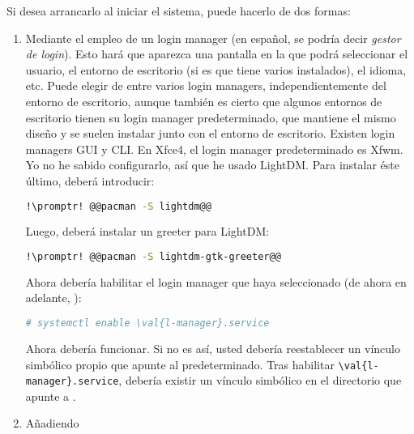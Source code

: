 Si desea arrancarlo al iniciar el sistema, puede hacerlo de dos formas:

\begin{enumerate}

  \item Mediante el empleo de un login manager (en español, se podría decir \emph{gestor de login}). Esto hará
    que aparezca una pantalla en la que podrá seleccionar el usuario, el entorno de escritorio (si es que tiene
    varios instalados), el idioma, etc. Puede elegir de entre varios login managers, independientemente del
    entorno de escritorio, aunque también es cierto que algunos entornos de escritorio tienen su login manager
    predeterminado, que mantiene el mismo diseño y se suelen instalar junto con el entorno de escritorio.
    Existen login managers GUI y CLI. En Xfce4, el login manager predeterminado es Xfwm. Yo no he sabido
    configurarlo, así que he usado LightDM. Para instalar éste último, deberá introducir:

    \begin{lstlisting}[gobble=2,language=bash,style=bashinteract,escapechar=!]
      !\promptr! @@pacman -S lightdm@@
    \end{lstlisting}

    \noindent Luego, deberá instalar un greeter para LightDM:

    \begin{lstlisting}[gobble=2,language=bash,style=bashinteract,escapechar=!]
      !\promptr! @@pacman -S lightdm-gtk-greeter@@
    \end{lstlisting}

    \noindent Ahora debería habilitar el login manager que haya seleccionado (de ahora en adelante,
    ):

    \begin{lstlisting}[gobble=2,language=bash,style=bashinteract,escapechar=!]
      # systemctl enable \val{l-manager}.service
    \end{lstlisting}

    \noindent Ahora debería funcionar. Si no es así, usted debería reestablecer un vínculo simbólico
     propio que apunte al  predeterminado. Tras habilitar
    \lstinline!\val{l-manager}.service!, debería existir un vínculo simbólico  en
    el directorio  que apunte a
    .

  \item Añadiendo


\end{enumerate}

